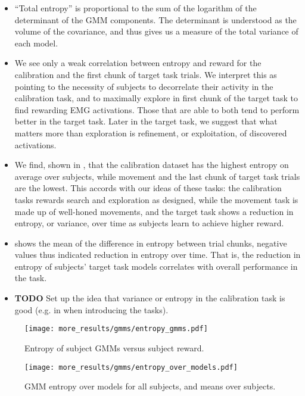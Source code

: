 \documentclass[../main.tex]{subfiles}
\begin{document}
\begin{itemize}
  \item ``Total entropy'' is proportional to the sum of the logarithm of the determinant of the GMM components. The determinant is understood as the volume of the covariance, and thus gives us a measure of the total variance of each model.
  \item We see only a weak correlation between entropy and reward for the calibration and the first chunk of target task trials. We interpret this as pointing to the necessity of subjects to decorrelate their activity in the calibration task, and to maximally explore in first chunk of the target task to find rewarding EMG activations. Those that are able to both tend to perform better in the target task. Later in the target task, we suggest that what matters more than exploration is refinement, or exploitation, of discovered activations.
  \item We find, shown in , that the calibration dataset has the highest entropy on average over subjects, while movement and the last chunk of target task trials are the lowest. This accords with our ideas of these tasks: the calibration tasks rewards search and exploration as designed, while the movement task is made up of well-honed movements, and the target task shows a reduction in entropy, or variance, over time as subjects learn to achieve higher reward.
  \item {} shows the mean of the difference in entropy between trial chunks, negative values thus indicated reduction in entropy over time. That is, the reduction in entropy of subjects' target task models correlates with overall performance in the task.
  \item \textbf{TODO} Set up the idea that variance or entropy in the calibration task is good (e.g. in  when introducing the tasks).
\end{itemize}

\begin{figure}[H]%
  \centering
    \texttt{[image: more\_results/gmms/entropy\_gmms.pdf]}
    \caption[Entropy of subject GMMs versus subject reward]{Entropy of subject GMMs versus subject reward.}\label{fig:gmm_entropy_vs_reward}
\end{figure}

\begin{figure}[H]%
  \centering
    \texttt{[image: more\_results/gmms/entropy\_over\_models.pdf]}
    \caption[Entropy of subject GMMs]{GMM entropy over models for all subjects, and means over subjects.}\label{fig:gmm_entropies}
\end{figure}
\end{document}
